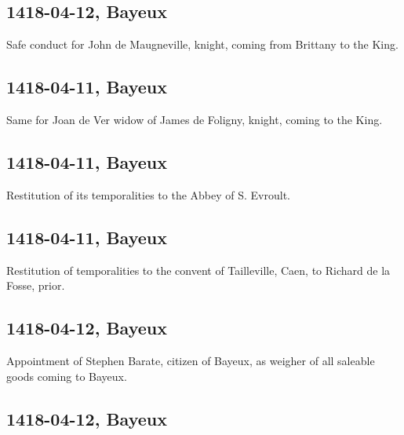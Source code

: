 \documentclass[a4paper,12pt,twoside]{book}
\begin{document}
                \subsection{1418-04-12, Bayeux}
                
                
                     Safe conduct for John de Maugneville, knight, coming from Brittany to the King.
                  
                
                \subsection{1418-04-11, Bayeux}
                
                
                     Same for Joan de Ver widow of James de Foligny, knight, coming to the King.
                  
                
                \subsection{1418-04-11, Bayeux}
                
                
                     Restitution of its temporalities to the Abbey of S. Evroult.
                  
                
                \subsection{1418-04-11, Bayeux}
                
                
                     Restitution of temporalities to the convent of Tailleville, Caen, to Richard de la Fosse, prior.
                  
                
                \subsection{1418-04-12, Bayeux}
                
                
                     Appointment of Stephen Barate, citizen of Bayeux, as weigher of all saleable goods coming to Bayeux.
                  
                
                \subsection{1418-04-12, Bayeux}
                
\end{document}
